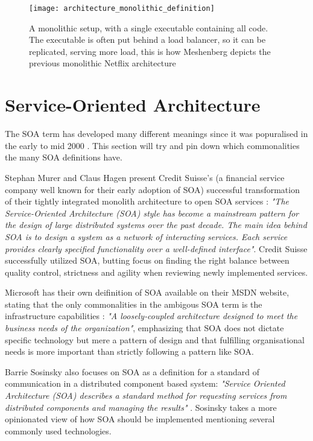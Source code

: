\begin{figure}[!htb]
\begin{center} 
  \texttt{[image: architecture\_monolithic\_definition]}  
  \caption{A monolithic setup, with a single executable containing all code. The executable is often put behind a load balancer, so it can be replicated, serving more load, this is how Meshenberg depicts the previous monolithic Netflix architecture}
  \label{fig:architecture_monolithic_definition}
  \end{center} 
\end{figure}

\section{Service-Oriented Architecture}
The SOA term has developed many different meanings \cite{microsoft2017chapter, george2016it, murer2015fifteen, sosinsky2010cloud, fowler2014microservicesoamonolith} since it was popuralised in the early to mid 2000 \cite[t.16:00]{george2016it}. This section will try and pin down which commonalities the many SOA definitions have.

Stephan Murer and Claus Hagen present Credit Suisse's (a financial service company well known for their early adoption of SOA) successful transformation of their tightly integrated monolith architecture to open SOA services  \cite{murer2015fifteen}: \textit{"The Service-Oriented Architecture (SOA) style has become a mainstream pattern for the design of large distributed systems over the past decade. The main idea behind SOA is to design a system as a network of interacting services. Each service provides clearly specified functionality over a well-defined interface"}. Credit Suisse successfully utilized SOA, butting focus on finding the right balance between quality control, strictness and agility when reviewing newly implemented services.

Microsoft has their own deifinition of SOA available on their MSDN website, stating that the only commonalities in the ambigous SOA term is the infrastructure capabilities \cite{microsoft2017chapter}: \textit{"A loosely‐coupled architecture designed to meet the business needs of the organization"}, emphasizing that SOA does not dictate specific technology but mere a pattern of design and that fulfilling organisational needs is more important than strictly following a pattern like SOA.

Barrie Sosinsky also focuses on SOA as a definition for a standard of communication in a distributed component based system: \textit{"Service Oriented Architecture (SOA) describes a standard method for requesting services from distributed components and managing the results"} \cite{sosinsky2010cloud}. Sosinsky takes a more opinionated view of how SOA should be implemented mentioning several commonly used technologies.

